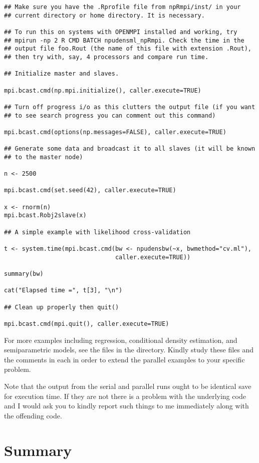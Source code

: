 \documentclass[nojss]{jss}
\begin{document}
\begin{verbatim}
## Make sure you have the .Rprofile file from npRmpi/inst/ in your
## current directory or home directory. It is necessary.

## To run this on systems with OPENMPI installed and working, try
## mpirun -np 2 R CMD BATCH npudensml_npRmpi. Check the time in the
## output file foo.Rout (the name of this file with extension .Rout),
## then try with, say, 4 processors and compare run time.

## Initialize master and slaves.

mpi.bcast.cmd(np.mpi.initialize(), caller.execute=TRUE)

## Turn off progress i/o as this clutters the output file (if you want
## to see search progress you can comment out this command)

mpi.bcast.cmd(options(np.messages=FALSE), caller.execute=TRUE)

## Generate some data and broadcast it to all slaves (it will be known
## to the master node)

n <- 2500

mpi.bcast.cmd(set.seed(42), caller.execute=TRUE)

x <- rnorm(n)
mpi.bcast.Robj2slave(x)

## A simple example with likelihood cross-validation

t <- system.time(mpi.bcast.cmd(bw <- npudensbw(~x, bwmethod="cv.ml"),
                               caller.execute=TRUE))

summary(bw)

cat("Elapsed time =", t[3], "\n")

## Clean up properly then quit()

mpi.bcast.cmd(mpi.quit(), caller.execute=TRUE)
\end{verbatim}

For more examples including regression, conditional density
estimation, and semiparametric models, see the files in the
 directory.  Kindly study these files and the
comments in each in order to extend the parallel examples to your
specific problem.

Note that the output from the serial and parallel runs ought to be
identical save for execution time. If they are not there is a problem
with the underlying code and I would ask you to kindly report such
things to me immediately along with the offending code.

\section{Summary}
\end{document}
